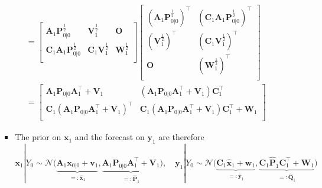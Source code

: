 \documentclass[12pt,a4paper]{article}
\begin{document}
\begin{itemize}
\begin{itemize}
\begin{itemize}
\begin{align}
        & =
          \begin{bmatrix}
            \bm{A}_{1}\bm{P}_{0|0}^{\frac{1}{2}} & \bm{V}_{1}^{\frac{1}{2}} & \bm{O}\\
            \bm{C}_{1}\bm{A}_{1}\bm{P}_{0|0}^{\frac{1}{2}} & \bm{C}_{1}\bm{V}_{1}^{\frac{1}{2}} & \bm{W}_{1}^{\frac{1}{2}}\\
          \end{bmatrix}
          \begin{bmatrix}
            (\bm{A}_{1}\bm{P}_{0|0}^{\frac{1}{2}})^{\top} & (\bm{C}_{1}\bm{A}_{1}\bm{P}_{0|0}^{\frac{1}{2}})^{\top}\\
            (\bm{V}_{1}^{\frac{1}{2}})^{\top} & (\bm{C}_{1}\bm{V}_{1}^{\frac{1}{2}})^{\top} \\
            \bm{O} & (\bm{W}_{1}^{\frac{1}{2}})^{\top} \\
          \end{bmatrix}
          \nonumber \\
        & = 
          \begin{bmatrix}
            \bm{A}_{1}\bm{P}_{0|0}\bm{A}_{1}^{\top} + \bm{V}_{1} & (\bm{A}_{1}\bm{P}_{0|0}\bm{A}_{1}^{\top} + \bm{V}_{1})\bm{C}_{1}^{\top}\\
            \bm{C}_{1}(\bm{A}_{1}\bm{P}_{0|0}\bm{A}_{1}^{\top} + \bm{V}_{1})^{\top} & \bm{C}_{1}(\bm{A}_{1}\bm{P}_{0|0}\bm{A}_{1}^{\top} + \bm{V}_{1})\bm{C}_{1}^{\top} + \bm{W}_{1}\\
          \end{bmatrix}
      \end{align}

    \item The prior on $\bm{x}_{1}$ and the forecast on $\bm{y}_{1}$ are therefore
      \begin{equation}\label{eq:alpha1Y0_linear}%
        \bm{x}_{1}|Y_{0}
        \sim \mathcal{N} \bigg(
        \underbrace{\bm{A}_{1}\bm{x}_{0|0} + \bm{v}_{1}}_{=:\hat{\bm{x}}_{1}},
        \underbrace{\bm{A}_{1}\bm{P}_{0|0}\bm{A}_{1}^{\top} + \bm{V}_{1}}_{=:\hat{\bm{P}}_{1}}
        \bigg),
        \quad
        \bm{y}_{1}|Y_{0}
        \sim \mathcal{N} \bigg(
        \underbrace{\bm{C}_{1}\hat{\bm{x}}_{1} + \bm{w}_{1}}_{=:\hat{\bm{y}}_{1}},
        \underbrace{\bm{C}_{1}\hat{\bm{P}}_{1}\bm{C}_{1}^{\top}+\bm{W}_{1}}_{=:\hat{\bm{Q}}_{1}}
        \bigg)
      \end{equation}


\end{itemize}
\end{itemize}
\end{itemize}
\end{document}

